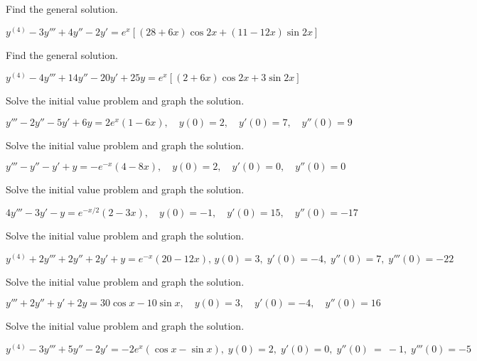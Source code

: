 \documentclass{ximera}
\begin{document}
\begin{problem}\label{exer:9.3.67}   Find the general solution.

$y^{(4)}-3y'''+4y''-2y'=e^x\left[(28+6x)\cos
2x+(11-12x)\sin2x\right]$
\end{problem}

\begin{problem}\label{exer:9.3.68}   Find the general solution. 

$y^{(4)}-4y'''+14y''-20y'+25y=e^x\left[(2+6x)\cos
2x+3\sin2x\right]$
\end{problem}

\begin{problem}\label{exer:9.3.69} Solve the initial value problem and graph the solution.

$y'''-2y''-5y'+6y=2e^x(1-6x),\quad
y(0)=2,
\quad y'(0)=7,\quad y''(0)=9$
\end{problem}

\begin{problem}\label{exer:9.3.70} Solve the initial value problem and graph the solution.

$y'''-y''-y'+y=-e^{-x}(4-8x),\quad
y(0)=2,
\quad y'(0)=0,\quad y''(0)=0$
\end{problem}

\begin{problem}\label{exer:9.3.71} Solve the initial value problem and graph the solution. 

$4y'''-3y'-y=e^{-x/2}(2-3x),\quad
y(0)=-1,
\quad y'(0)=15,\quad y''(0)=-17$
\end{problem}

\begin{problem}\label{exer:9.3.72}  Solve the initial value problem and graph the solution.

$y^{(4)}+2y'''+2y''+2y'+y=e^{-x}(20-12x),\,
y(0)=3,\; y'(0)=-4,\; y''(0)=7,\; y'''(0)=-22$
\end{problem}

\begin{problem}\label{exer:9.3.73}  Solve the initial value problem and graph the solution.

$y'''+2y''+y'+2y=30\cos x-10\sin x,
\quad y(0)=3,\quad y'(0)=-4,\quad y''(0)=16$
\end{problem}

\begin{problem}\label{exer:9.3.74}  Solve the initial value problem and graph the solution.

$y^{(4)}-3y'''+5y''-2y'=-2e^x(\cos x-\sin
x),\; y(0)=2,\; y'(0)=0,\; y''(0)~=~-1, \; y'''(0)=-5$
\end{problem}
\end{document}
